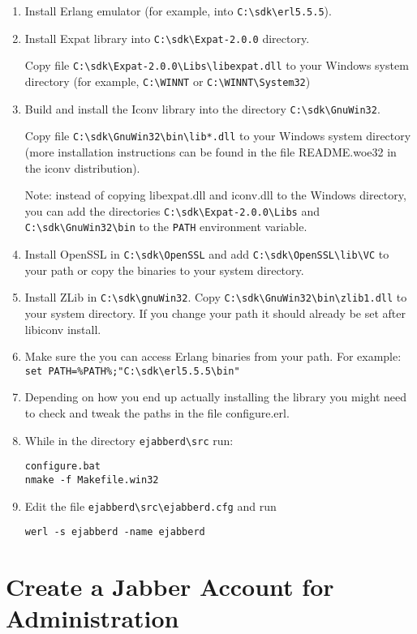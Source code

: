 \documentclass[a4paper,10pt]{book}
\newcommand{\ejabberd}{\texttt{ejabberd}}
\begin{document}
\begin{enumerate}
\item Install Erlang emulator (for example, into \verb|C:\sdk\erl5.5.5|).
\item Install Expat library into \verb|C:\sdk\Expat-2.0.0|
  directory.

  Copy file \verb|C:\sdk\Expat-2.0.0\Libs\libexpat.dll|
  to your Windows system directory (for example, \verb|C:\WINNT| or
  \verb|C:\WINNT\System32|)
\item Build and install the Iconv library into the directory
  \verb|C:\sdk\GnuWin32|.

  Copy file \verb|C:\sdk\GnuWin32\bin\lib*.dll| to your
  Windows system directory (more installation instructions can be found in the
  file README.woe32 in the iconv distribution).

  Note: instead of copying libexpat.dll and iconv.dll to the Windows
  directory, you can add the directories
  \verb|C:\sdk\Expat-2.0.0\Libs| and
  \verb|C:\sdk\GnuWin32\bin| to the \verb|PATH| environment
  variable.
\item Install OpenSSL in \verb|C:\sdk\OpenSSL| and add \verb|C:\sdk\OpenSSL\lib\VC| to your path or copy the binaries to your system directory.
\item Install ZLib in \verb|C:\sdk\gnuWin32|. Copy 
  \verb|C:\sdk\GnuWin32\bin\zlib1.dll| to your system directory. If you change your path it should already be set after  libiconv install. 
\item Make sure the you can access Erlang binaries from your path. For example: \verb|set PATH=%PATH%;"C:\sdk\erl5.5.5\bin"|
\item Depending on how you end up actually installing the library you might need to check and tweak the paths in the file configure.erl.
\item While in the directory \verb|ejabberd\src| run:
\begin{verbatim}
configure.bat
nmake -f Makefile.win32
\end{verbatim}
\item Edit the file \verb|ejabberd\src\ejabberd.cfg| and run
\begin{verbatim}
werl -s ejabberd -name ejabberd
\end{verbatim}
\end{enumerate}



\section{Create a Jabber Account for Administration}
\label{initialadmin}
\end{document}
